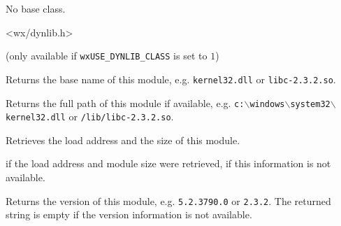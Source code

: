 
No base class.


<wx/dynlib.h>

(only available if \texttt{wxUSE\_DYNLIB\_CLASS} is set to $1$)


\label{wxdynamiclibrarygetname}


Returns the base name of this module, e.g. \texttt{kernel32.dll} or 
\texttt{libc-2.3.2.so}.


\label{wxdynamiclibrarygetpath}


Returns the full path of this module if available, e.g. 
\texttt{c:$\backslash$windows$\backslash$system32$\backslash$kernel32.dll} or 
\texttt{/lib/libc-2.3.2.so}.


\label{wxdynamiclibrarygetaddress}


Retrieves the load address and the size of this module.





\true if the load address and module size were retrieved, \false if this
information is not available.


\label{wxdynamiclibrarygetversion}


Returns the version of this module, e.g. \texttt{5.2.3790.0} or 
\texttt{2.3.2}. The returned string is empty if the version information is not
available.

